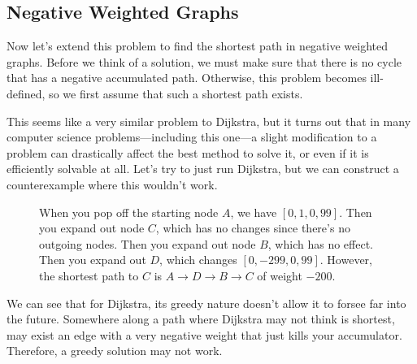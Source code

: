 \subsection{Negative Weighted Graphs} 

  Now let's extend this problem to find the shortest path in negative weighted graphs. Before we think of a solution, we must make sure that there is no cycle that has a negative accumulated path. Otherwise, this problem becomes ill-defined, so we first assume that such a shortest path exists. 

  This seems like a very similar problem to Dijkstra, but it turns out that in many computer science problems---including this one---a slight modification to a problem can drastically affect the best method to solve it, or even if it is efficiently solvable at all. Let's try to just run Dijkstra, but we can construct a counterexample where this wouldn't work. 

  \begin{figure}[H]
    \centering 
    \caption{When you pop off the starting node $A$, we have $[0, 1, 0, 99]$. Then you expand out node $C$, which has no changes since there's no outgoing nodes. Then you expand out node $B$, which has no effect. Then you expand out $D$, which changes $[0, -299, 0, 99]$. However, the shortest path to $C$ is $A \rightarrow D \rightarrow B \rightarrow C$ of weight $-200$.}
  \end{figure} 

  We can see that for Dijkstra, its greedy nature doesn't allow it to forsee far into the future. Somewhere along a path where Dijkstra may not think is shortest, may exist an edge with a very negative weight that just kills your accumulator. Therefore, a greedy solution may not work. 

